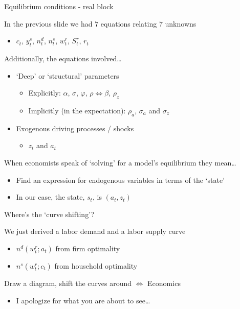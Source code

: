 \begin{frame}{Equilibrium conditions - real block}

In the previous slide we had $7$ equations relating $7$ unknowns
\begin{itemize}
\item	$c_{t}$, $y^{s}_{t}$, $n^{d}_{t}$, $n^{s}_{t}$, $w^{r}_{t}$, $S^{r}_{t}$, $r_{t}$ %
\end{itemize}

\vspace{3mm}
Additionally, the equations involved\ldots
\begin{itemize}
\item	`Deep' or `structural' parameters
	\begin{itemize}
	\item 	Explicitly: $\alpha$, $\sigma$, $\varphi$, $\rho \Leftrightarrow \beta$, $\rho_{z}$
	\item	Implicitly (in the expectation): $\rho_{a}$, $\sigma_{a}$ and $\sigma_{z}$
	\end{itemize}
\item	Exogenous driving processes / shocks
	\begin{itemize}
	\item	$z_{t}$ and $a_{t}$
	\end{itemize}
\end{itemize}

\vspace{2mm}
When economists speak of `solving' for a model's equilibrium they mean\ldots
\begin{itemize}
\item	Find an expression for endogenous variables in terms of the `state'
\item	In our case, the state, $s_{t}$, is $(a_{t}, z_{t})$
\end{itemize}

\end{frame}



\begin{frame}{Where's the `curve shifting'?}

We just derived a labor demand and a labor supply curve
	\begin{itemize}
	\item	$n^{d}(w^{r}_{t}; a_{t})$ from firm optimality
	\item	$n^{s}(w^{r}_{t}; c_{t})$ from household optimality
	\end{itemize}

\vspace{3mm}	
Draw a diagram, shift the curves around $\Leftrightarrow$ Economics
	\begin{itemize}
	\item	I apologize for what you are about to see\ldots
	\end{itemize}

\end{frame}

